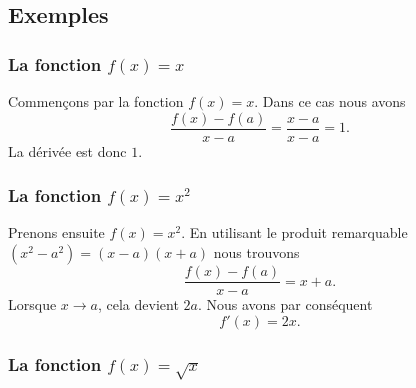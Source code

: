 \subsection{Exemples}

\subsubsection{La fonction $f(x)=x$}

Commençons par la fonction $f(x)=x$. Dans ce cas nous avons
\begin{equation}
	\frac{ f(x)-f(a) }{ x-a }=\frac{ x-a }{ x-a }=1.
\end{equation}
La dérivée est donc $1$.


\subsubsection{La fonction $f(x)=x^2$}

Prenons ensuite $f(x)=x^2$. En utilisant le produit remarquable $(x^2-a^2)=(x-a)(x+a)$ nous trouvons
\begin{equation}
	\frac{ f(x)-f(a) }{ x-a }=x+a.
\end{equation}
Lorsque $x\to a$, cela devient $2a$. Nous avons par conséquent
\begin{equation}
	f'(x)=2x.
\end{equation}

\subsubsection{La fonction $f(x)=\sqrt{x}$}

